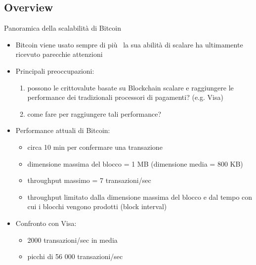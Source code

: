 \documentclass{beamer}
\begin{document}
  \subsection{Overview}
  \begin{frame}{Panoramica della scalabilità di Bitcoin}
      \begin{itemize}
          \item Bitcoin viene usato sempre di più \MVRightarrow\, la sua abilità di scalare ha ultimamente ricevuto parecchie attenzioni
          \item Principali preoccupazioni:
          \begin{enumerate}
              \item possono le crittovalute basate su Blockchain scalare e raggiungere le performance dei tradizionali processori di pagamenti? (e.g. Visa)
              \item come fare per raggiungere tali performance? 
          \end{enumerate}
          \pause
          \item Performance attuali di Bitcoin: 
          \begin{itemize}
              \item circa 10 min per confermare una transazione 
              \item dimensione massima del blocco = 1 MB (dimensione media = 800 KB) \cite{current-block-size}
              \item throughput massimo = 7 transazioni/sec \cite{wikipedia_scalability_2018}
              \item throughput limitato dalla dimensione massima del blocco e dal tempo con cui i blocchi vengono prodotti (block interval)
          \end{itemize} \pause
          \item Confronto con Visa:  \cite{wikipedia_scalability_2018}
          \begin{itemize}
              \item 2000 transazioni/sec in media 
              \item picchi di 56 000 transazioni/sec
          \end{itemize}
      \end{itemize}
  \end{frame}
  
  
  
  
  
\end{document}
